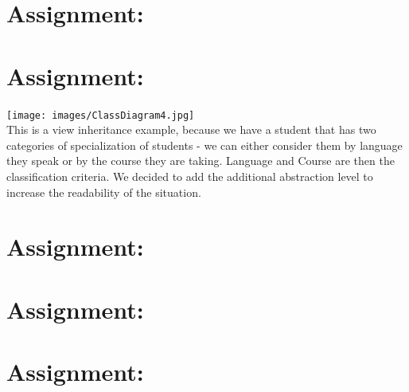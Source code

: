 \documentclass[a4paper,12pt,oneside]{scrreprt}
\begin{document}
	\section{Assignment:}
	\section{Assignment:}
		\texttt{[image: images/ClassDiagram4.jpg]}\\
		This is a view inheritance example, because we have a student that has two categories of specialization of students - we can either consider them by language they speak or by the course they are taking.
		Language and Course are then the classification criteria. We decided to add the additional abstraction level to increase the readability of the situation.
	
    \section{Assignment:}
    
  
  \section{Assignment:}
		
	\section{Assignment:}
	\section{}
	
	\section{}
	
\end{document}
